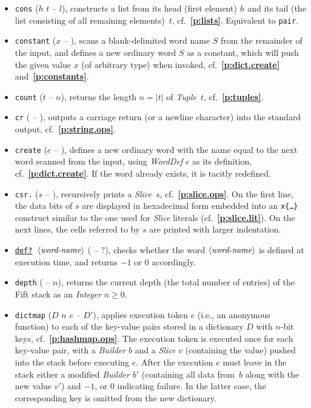 \documentclass[12pt,oneside]{article}
\def\refpoint#1{{\rm\textbf{\ref{#1}}}}
\let\ptref=\refpoint
\begin{document}
\begin{itemize}
\item {\tt cons} ($h$ $t$ -- $l$), constructs a list from its head (first element) $h$ and its tail (the list consisting of all remaining elements)~$t$, cf.~\ptref{p:lists}. Equivalent to {\tt pair}.
\item {\tt constant} ($x$ -- ), scans a blank-delimited word name $S$ from the remainder of the input, and defines a new ordinary word $S$ as a constant, which will push the given value $x$ (of arbitrary type) when invoked, cf.~\ptref{p:dict.create} and~\ptref{p:constants}.
\item {\tt count} ($t$ -- $n$), returns the length $n=|t|$ of {\em Tuple\/}~$t$, cf.~\ptref{p:tuples}.
\item {\tt cr} ( -- ), outputs a carriage return (or a newline character) into the standard output, cf.~\ptref{p:string.ops}.
\item {\tt create} ($e$ -- ), defines a new ordinary word with the name equal to the next word scanned from the input, using {\em WordDef\/} $e$ as its definition, cf.~\ptref{p:dict.create}. If the word already exists, it is tacitly redefined.
\item {\tt csr.} ($s$ -- ), recursively prints a {\em Slice}~$s$, cf.~\ptref{p:slice.ops}. On the first line, the data bits of $s$ are displayed in hexadecimal form embedded into an {\tt x\{\dots\}} construct similar to the one used for {\em Slice\/} literals (cf.~\ptref{p:slice.lit}). On the next lines, the cells referred to by $s$ are printed with larger indentation.
\item {\tt \underline{def?} $\langle\textit{word-name\/}\rangle$} ( -- $?$), checks whether the word $\langle\textit{word-name\/}\rangle$ is defined at execution time, and returns $-1$ or $0$ accordingly.
\item {\tt depth} ( -- $n$), returns the current depth (the total number of entries) of the Fift stack as an {\em Integer\/} $n\geq0$.
\item {\tt dictmap} ($D$ $n$ $e$ -- $D'$), applies execution token $e$ (i.e., an anonymous function) to each of the key-value pairs stored in a dictionary $D$ with $n$-bit keys, cf.~\ptref{p:hashmap.ops}. The execution token is executed once for each key-value pair, with a {\em Builder\/} $b$ and a {\em Slice\/} $v$ (containing the value) pushed into the stack before executing $e$. After the execution $e$ must leave in the stack either a modified {\em Builder\/} $b'$ (containing all data from~$b$ along with the new value $v'$) and $-1$, or $0$ indicating failure. In the latter case, the corresponding key is omitted from the new dictionary.

\end{itemize}
\end{document}
